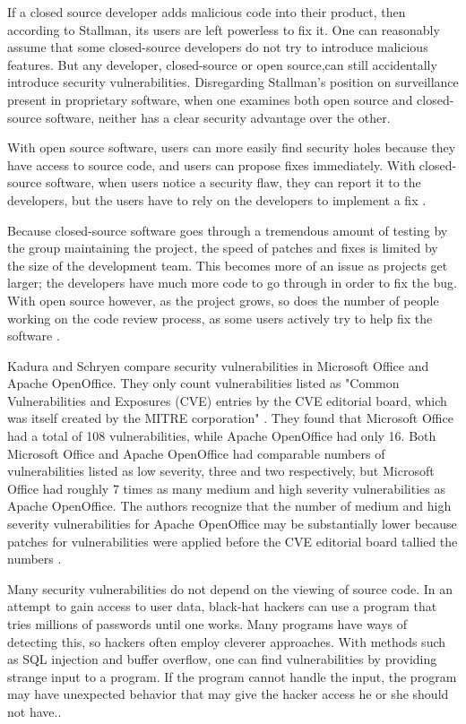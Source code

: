 ﻿If a closed source developer adds malicious code into their product, then according to Stallman, its users are left powerless to fix it\citeyear[para. 36]{rms2011}.
One can reasonably assume that some closed-source developers do not try
to introduce malicious features. But any developer, closed-source or
open source,can still accidentally introduce security
vulnerabilities. Disregarding Stallman's position on surveillance present in
proprietary software, when one examines both open source and closed-source
software, neither has a clear security advantage over the other.

With open source software, users can more easily find security holes because
they have access to source code, and users can propose fixes immediately.
With closed-source software, when users notice a security flaw, they can report
it to the developers, but the users have to rely on the developers to implement a
fix \cite[para. 17]{kadura}.

Because closed-source software goes through a tremendous amount of testing
by the group maintaining the project, the speed of patches and fixes is limited
by the size of the development team. This becomes more of an issue as projects
get larger; the developers have much more code to go through in order to fix the
bug. With open source however, as the project grows, so does the number of
people working on the code review process, as some users actively try to help
fix the software \cite[p. ~245]{boulanger}.

Kadura and Schryen compare security vulnerabilities in Microsoft
Office and Apache OpenOffice. They only count vulnerabilities listed
as "Common Vulnerabilities and Exposures (CVE) entries by the CVE editorial
board, which was itself created by the MITRE corporation"
\citeyear{kadura}. They found that Microsoft Office had a total of 108
vulnerabilities, while Apache OpenOffice had only 16. Both Microsoft Office and
Apache OpenOffice had comparable numbers of vulnerabilities listed as low severity,
three and two respectively, but Microsoft Office had roughly 7 times as many
medium and high severity vulnerabilities as Apache OpenOffice. The authors recognize
that the number of medium and high severity vulnerabilities for Apache OpenOffice may
be substantially lower because patches for vulnerabilities were applied before
the CVE editorial board tallied the numbers \cite{kadura}.

Many security vulnerabilities do not depend on the viewing of source code.
In an attempt to gain access to user data, black-hat hackers can use a program
that tries millions of passwords until one works. Many programs have ways of
detecting this, so hackers often employ cleverer approaches. With methods
such as SQL injection and buffer overflow, one can find vulnerabilities by
providing strange input to a program. If the program cannot handle the input,
the program may have unexpected behavior that may give the hacker access he or she
should not have.\cite[p. ~8-9]{clarke}.

